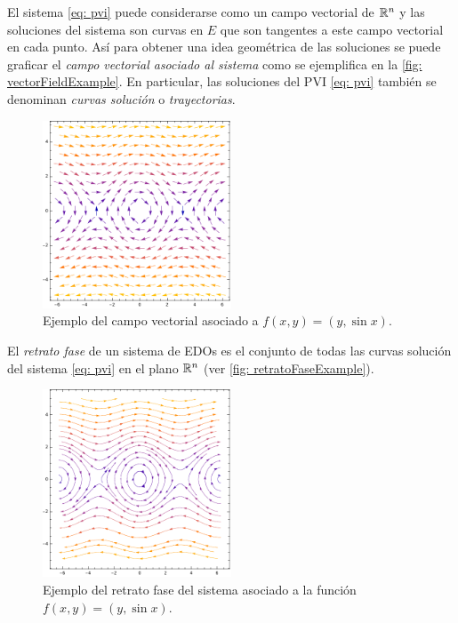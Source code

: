    El sistema \eqref{eq: pvi} puede considerarse como un campo vectorial de ${\mathbb{R}}^{n}$ y las soluciones del sistema son curvas en $E$ que son tangentes a este campo vectorial en cada punto. Así para obtener una idea geométrica de las soluciones se puede graficar el \textit{campo vectorial asociado al sistema} como se ejemplifica en la \autoref{fig: vectorFieldExample}. En particular, las soluciones del PVI \eqref{eq: pvi} también se denominan \textit{curvas solución} o \textit{trayectorias}.
   \begin{figure}
       \centering
       \includegraphics[width=0.5\textwidth]{Source/vectorFieldExample.pdf}
       \caption{Ejemplo del campo vectorial asociado a $f(x,y)=(y,\sin{x})$.}
       \label{fig: vectorFieldExample}
   \end{figure}
   El \textit{retrato fase} de un sistema de EDOs es el conjunto de todas las curvas solución del sistema \eqref{eq: pvi} en el plano ${\mathbb{R}}^{n}$ (ver \autoref{fig: retratoFaseExample}).
   \begin{figure}
   	\centering
   	\includegraphics[width=0.5\textwidth]{Source/retratoFaseExample.pdf}
   	\caption{Ejemplo del retrato fase del sistema asociado a la función $f(x,y)=(y,\sin{x})$.}
   	\label{fig: retratoFaseExample}
   \end{figure}
   
